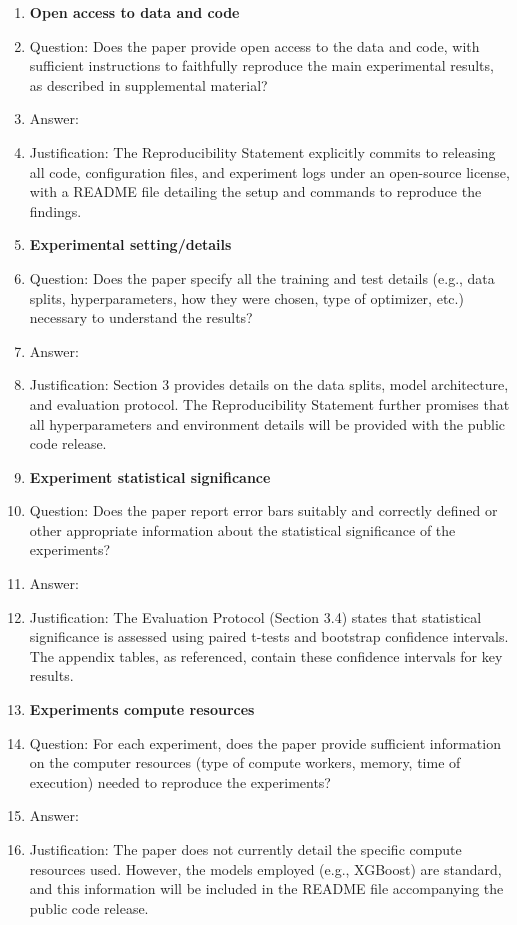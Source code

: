 ﻿\documentclass{article}
\begin{document}
\begin{enumerate}
\item {\bf Open access to data and code}
    \item[] Question: Does the paper provide open access to the data and code, with sufficient instructions to faithfully reproduce the main experimental results, as described in supplemental material?
    \item[] Answer: \answerYes{}
    \item[] Justification: The Reproducibility Statement explicitly commits to releasing all code, configuration files, and experiment logs under an open-source license, with a README file detailing the setup and commands to reproduce the findings.

\item {\bf Experimental setting/details}
    \item[] Question: Does the paper specify all the training and test details (e.g., data splits, hyperparameters, how they were chosen, type of optimizer, etc.) necessary to understand the results?
    \item[] Answer: \answerYes{}
    \item[] Justification: Section 3 provides details on the data splits, model architecture, and evaluation protocol. The Reproducibility Statement further promises that all hyperparameters and environment details will be provided with the public code release.

\item {\bf Experiment statistical significance}
    \item[] Question: Does the paper report error bars suitably and correctly defined or other appropriate information about the statistical significance of the experiments?
    \item[] Answer: \answerYes{}
    \item[] Justification: The Evaluation Protocol (Section 3.4) states that statistical significance is assessed using paired t-tests and bootstrap confidence intervals. The appendix tables, as referenced, contain these confidence intervals for key results.

\item {\bf Experiments compute resources}
    \item[] Question: For each experiment, does the paper provide sufficient information on the computer resources (type of compute workers, memory, time of execution) needed to reproduce the experiments?
    \item[] Answer: \answerNo{}
    \item[] Justification: The paper does not currently detail the specific compute resources used. However, the models employed (e.g., XGBoost) are standard, and this information will be included in the README file accompanying the public code release.
    

\end{enumerate}
\end{document}
